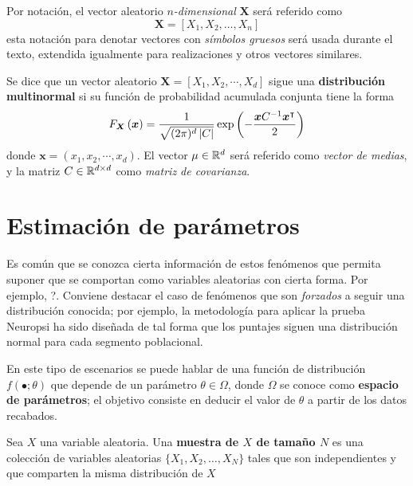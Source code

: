 Por notación, el vector aleatorio \textit{$n$-dimensional} $\boldsymbol{X}$ será referido como
\begin{equation}
\boldsymbol{X} = [X_1, X_2, \dots, X_n]
\end{equation}
esta notación para denotar vectores con \textit{símbolos gruesos} será usada durante el texto, extendida igualmente para realizaciones y otros vectores similares.

\begin{ejemplo}
Se dice que un vector aleatorio $\boldsymbol{X} = [X_1, X_2, \cdots, X_d]$ sigue una \textbf{distribución multinormal} si su función de probabilidad acumulada conjunta tiene la forma
\begin{equation}
F_{\boldsymbol{X}}\left( \boldsymbol{x} \right) = \frac{1}{\sqrt{(2\pi)^{d}\left| C \right|}} \exp\left( -\frac{\boldsymbol{x} C^{-1} \boldsymbol{x}^{\intercal} }{2} \right)
\end{equation}
donde $\boldsymbol{x} = (x_1, x_2, \cdots, x_d)$. El vector $\mu \in \mathbb{R}^{d}$ será referido como \textit{vector de medias}, y la matriz $C \in \mathbb{R}^{d\times d}$ como \textit{matriz de covarianza}.
\end{ejemplo}



\section{Estimación de parámetros}

Es común que se conozca cierta información de estos fenómenos que permita suponer que se comportan como variables aleatorias con cierta forma. Por ejemplo, ?.%
%
Conviene destacar el caso de fenómenos que son \textit{forzados} a seguir una distribución conocida; por ejemplo, la metodología para aplicar la prueba Neuropsi \cite{Ostrosky00} ha sido diseñada de tal forma que los puntajes siguen una distribución normal para cada segmento poblacional.

En este tipo de escenarios se puede hablar de una función de distribución $f(\bullet; \theta)$ que depende de un parámetro $\theta \in \Omega$, donde $\Omega$ se conoce como \textbf{espacio de parámetros}; el objetivo consiste en deducir el valor de $\theta$ a partir de los datos recabados.

\begin{definicion}
Sea $X$ una variable aleatoria. Una \textbf{muestra de $X$ de tamaño $N$} es una colección de variables aleatorias $\{ X_1, X_2, \dots, X_N \}$ tales que son independientes y que comparten la misma distribución de $X$
\end{definicion}

